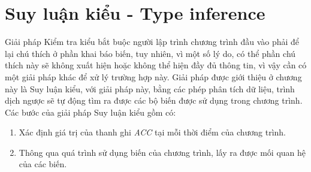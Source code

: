 \chapter{Suy luận kiểu - Type inference}
Giải pháp Kiểm tra kiểu bắt buộc người lập trình chương trình đầu vào phải để lại chú thích ở phần khai báo biến, tuy nhiên, vì một số lý do, có thể phần chú thích này sẽ không xuất hiện hoặc không thể hiện đầy đủ thông tin, vì vậy cần có một giải pháp khác để xử lý trường hợp này. Giải pháp được giới thiệu ở chương này là Suy luận kiểu, với giải pháp này, bằng các phép phân tích dữ liệu, trình dịch ngược sẽ tự động tìm ra được các bộ biến được sử dụng trong chương trình. Các bước của giải pháp Suy luận kiểu gồm có:
\begin{enumerate}
	\item Xác định giá trị của thanh ghi \textit{ACC} tại mỗi thời điểm của chương trình.
	\item Thông qua quá trình sử dụng biến của chương trình, lấy ra được mối quan hệ của các biến.
\end{enumerate}

